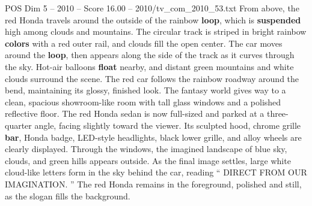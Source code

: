 \begin{textsample}{POS Dim 5 – 2010 – Score 16.00 – 2010/tv\_com\_2010\_53.txt}
From above, the red Honda travels around the outside of the rainbow \textbf{loop}, which is \textbf{suspended} high among clouds and mountains.
The circular track is striped in bright rainbow \textbf{colors} with a red outer rail, and clouds fill the open center.
The car moves around the \textbf{loop}, then appears along the side of the track as it curves through the sky.
Hot-air balloons \textbf{float} nearby, and distant green mountains and white clouds surround the scene.
The red car follows the rainbow roadway around the bend, maintaining its glossy, finished look.
The fantasy world gives way to a clean, spacious showroom-like room with tall glass windows and a polished reflective floor.
The red Honda sedan is now full-sized and parked at a three-quarter angle, facing slightly toward the viewer.
Its sculpted hood, chrome grille \textbf{bar}, Honda badge, LED-style headlights, black lower grille, and alloy wheels are clearly displayed.
Through the windows, the imagined landscape of blue sky, clouds, and green hills appears outside.
As the final image settles, large white cloud-like letters form in the sky behind the car, reading “ DIRECT FROM OUR IMAGINATION. ” The red Honda remains in the foreground, polished and still, as the slogan fills the background.

\end{textsample}
